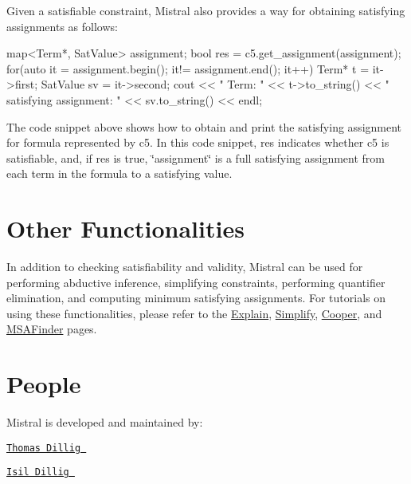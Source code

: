 \-Given a satisfiable constraint, \-Mistral also provides a way for obtaining satisfying assignments as follows\-:

\begin{DoxyVerb}
map<Term*, SatValue> assignment;
bool res = c5.get_assignment(assignment);
for(auto it = assignment.begin(); it!= assignment.end(); it++)
{
    Term* t = it->first;
    SatValue sv = it->second;
    cout << " Term: " << t->to_string() << " satisfying assignment: " << sv.to_string() << endl;
}
\end{DoxyVerb}


\-The code snippet above shows how to obtain and print the satisfying assignment for formula represented by c5. \-In this code snippet, res indicates whether c5 is satisfiable, and, if res is true, \char`\"{}assignment\char`\"{} is a full satisfying assignment from each term in the formula to a satisfying value.\hypertarget{index_further}{}\section{\-Other Functionalities}\label{index_further}
\-In addition to checking satisfiability and validity, \-Mistral can be used for performing abductive inference, simplifying constraints, performing quantifier elimination, and computing minimum satisfying assignments. \-For tutorials on using these functionalities, please refer to the \hyperlink{explain}{\-Explain}, \hyperlink{simplify}{\-Simplify}, \hyperlink{cooper}{\-Cooper}, and \hyperlink{msa}{\-M\-S\-A\-Finder} pages.\hypertarget{index_people}{}\section{\-People}\label{index_people}
\-Mistral is developed and maintained by\-:
\begin{DoxyItemize}
\item \href{http://www.cs.wm.edu/~tdillig/}{\tt \-Thomas \-Dillig }
\item \href{http://www.cs.wm.edu/~idillig/}{\tt \-Isil \-Dillig }
\end{DoxyItemize}

